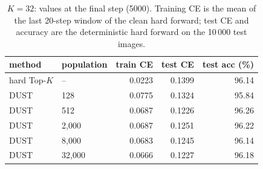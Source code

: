 \begin{table}[H]
\centering
\caption{$K = 32$: values at the final step (5000). Training CE is the mean of the last 20-step window of the clean hard forward; test CE and accuracy are the deterministic hard forward on the 10\,000 test images.}
\label{tab:k32}
\begin{tabular}{llrrr}
\toprule
    method & population & train CE & test CE & test acc (\%) \\
\midrule
    hard Top-$K$ & -- & 0.0223 & 0.1399 & 96.14 \\
    DUST & 128 & 0.0775 & 0.1324 & 95.84 \\
    DUST & 512 & 0.0687 & 0.1226 & 96.26 \\
    DUST & 2,000 & 0.0687 & 0.1251 & 96.22 \\
    DUST & 8,000 & 0.0683 & 0.1245 & 96.14 \\
    DUST & 32,000 & 0.0666 & 0.1227 & 96.18 \\
\bottomrule
\end{tabular}
\end{table}
